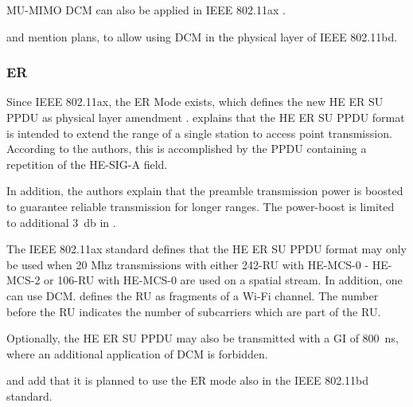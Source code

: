 MU-\ac{MIMO} \ac{DCM} can also be applied in IEEE 802.11ax \cite{ieee_standard_2021ax}.

\textcite{jacob_system-level_2020} and \textcite{triwinarko_phy_2021} mention plans,
to allow using \ac{DCM} in the physical layer of IEEE 802.11bd.

\subsubsection*{\acf{ER}}
Since IEEE 802.11ax, the \ac{ER} Mode exists, which defines the new \ac{HE} \ac{ER} \ac{SU} \ac{PPDU} as physical layer amendment
\cite{ieee_standard_2021ax,afaqui_ieee_2017} .
\textcite{deng_ieee_2017} explains that the \ac{HE} \ac{ER} \ac{SU} \ac{PPDU} format is intended to extend the range of
a single station to access point transmission.
According to the authors, this is accomplished by the \ac{PPDU} containing a repetition of the \ac{HE}-SIG-A field.

In addition, the authors explain that the preamble transmission power is boosted
to guarantee reliable transmission for longer ranges.
The power-boost is limited to additional \SI{3}{\decibel}
in \cite{ieee_standard_2021ax,jacob_system-level_2020}.

The IEEE 802.11ax \cite{ieee_standard_2021ax} standard defines that the \ac{HE} \ac{ER} \ac{SU} \ac{PPDU} format may only be used
when 20 Mhz transmissions with either 242-\ac{RU} with \ac{HE}-MCS-0 - \ac{HE}-MCS-2 or 106-\ac{RU} with \ac{HE}-MCS-0 are used on a spatial stream.
In addition, one can use \ac{DCM}.
\textcite[311]{sauter_wireless_2022} defines the \ac{RU} as fragments of a Wi-Fi channel. The number before the \ac{RU}
indicates the number of subcarriers which are part of the \ac{RU}.

Optionally, the \ac{HE} \ac{ER} \ac{SU} \ac{PPDU} may also be transmitted with a \ac{GI} of \SI{800}{\nano\second},
where an additional application of \ac{DCM} is forbidden.

\textcite{jacob_system-level_2020} and \textcite{triwinarko_phy_2021} add that it is planned to use
the \ac{ER} mode also in the IEEE 802.11bd standard.

